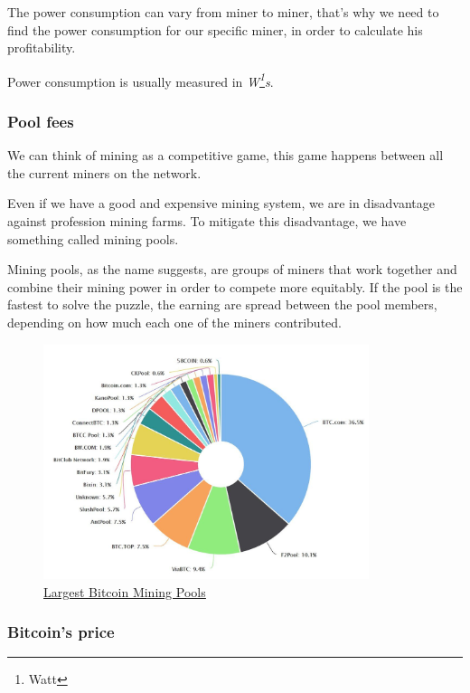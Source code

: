\documentclass{article}
\newcommand\tab[1][1cm]{\hspace*{#1}}
\begin{document}
\tab The power consumption can vary from miner to miner, that's why we need to find the power consumption for our specific miner, in order to calculate his profitability.  

Power consumption is usually measured in \textit{W\footnote{Watt}s}.

\subsubsection{Pool fees}

\tab We can think of mining as a competitive game, this game happens between all the current miners on the network. 

Even if we have a good and expensive mining system, we are in disadvantage against profession mining farms. To mitigate this disadvantage, we have something called mining pools.

Mining pools, as the name suggests, are groups of miners that work together and combine their mining power in order to compete more equitably. If the pool is the fastest to solve the puzzle, the earning are spread between the pool members, depending on how much each one of the miners contributed.

\begin{figure}[H]
    \begin{center}
        \includegraphics[width=0.85\textwidth]{images/mining_pools.jpeg}
        \caption{\href{https://www.pinterest.pt/pin/601863937677057884/}{\underline{Largest Bitcoin Mining Pools}}}
    \end{center}
\end{figure}

\newpage

\subsubsection{Bitcoin's price}
\end{document}
